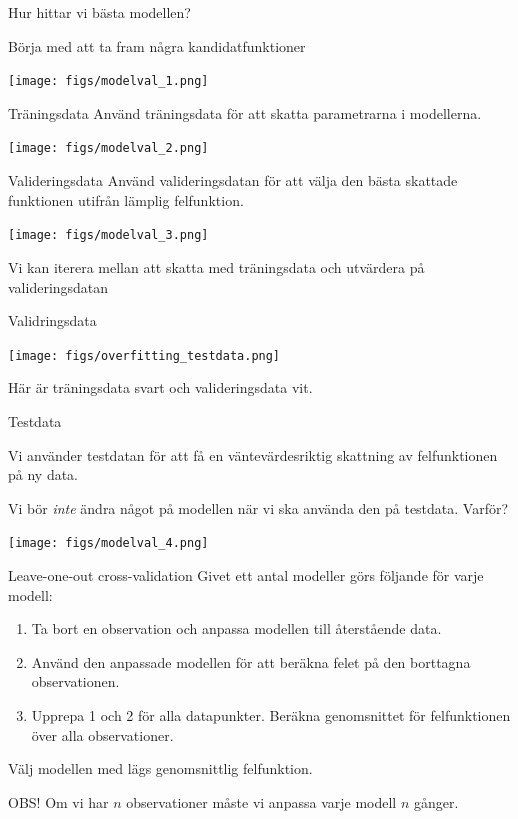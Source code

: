 \documentclass[10pt,english]{beamer}
\begin{document}
\begin{frame}{Hur hittar vi bästa modellen?}
    
    Börja med att ta fram några kandidatfunktioner

    \texttt{[image: figs/modelval\_1.png]}

\end{frame}

\begin{frame}{Träningsdata}
    Använd träningsdata för att skatta parametrarna i modellerna.

    \texttt{[image: figs/modelval\_2.png]}
\end{frame}

\begin{frame}{Valideringsdata}
    Använd valideringsdatan för att välja den bästa skattade funktionen utifrån lämplig felfunktion. 

    \texttt{[image: figs/modelval\_3.png]}

    Vi kan iterera mellan att skatta med träningsdata och utvärdera på valideringsdatan

\end{frame}

\begin{frame}{Validringsdata}
    
    \texttt{[image: figs/overfitting\_testdata.png]}

    Här är träningsdata svart och valideringsdata vit.

\end{frame}

\begin{frame}{Testdata}
    
    Vi använder testdatan för att få en väntevärdesriktig skattning av felfunktionen på ny data.

    Vi bör \emph{inte} ändra något på modellen när vi ska använda den på testdata. Varför?

    \texttt{[image: figs/modelval\_4.png]}

\end{frame}

\begin{frame}{Leave-one-out cross-validation}
    Givet ett antal modeller görs följande för varje modell:
    \begin{enumerate}
        \item Ta bort en observation och anpassa modellen till återstående data.
        \item Använd den anpassade modellen för att beräkna felet på den borttagna observationen.
        \item Upprepa 1 och 2 för alla datapunkter. Beräkna genomsnittet för felfunktionen över alla observationer.
    \end{enumerate}
    Välj modellen med lägs genomsnittlig felfunktion.

    OBS! Om vi har $n$ observationer måste vi anpassa varje modell $n$ gånger.
\end{frame}
\end{document}

